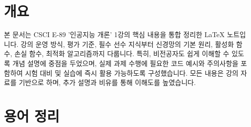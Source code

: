 \documentclass[11pt,a4paper]{article}
\begin{document}
\newpage
\section*{개요}
본 문서는 CSCI E-89 '인공지능 개론' 1강의 핵심 내용을 통합 정리한 LaTeX 노트입니다.
강의 운영 방식, 평가 기준, 필수 선수 지식부터 신경망의 기본 원리, 활성화 함수, 손실 함수, 최적화 알고리즘까지 다룹니다.
특히, 비전공자도 쉽게 이해할 수 있도록 개념 설명에 중점을 두었으며,
실제 과제 수행에 필요한 코드 예시와 주의사항을 포함하여 시험 대비 및 실습에 즉시 활용 가능하도록 구성했습니다.
모든 내용은 강의 자료를 기반으로 하며, 추가 설명과 비유를 통해 이해도를 높였습니다.

\newpage
\section*{용어 정리}
\end{document}
